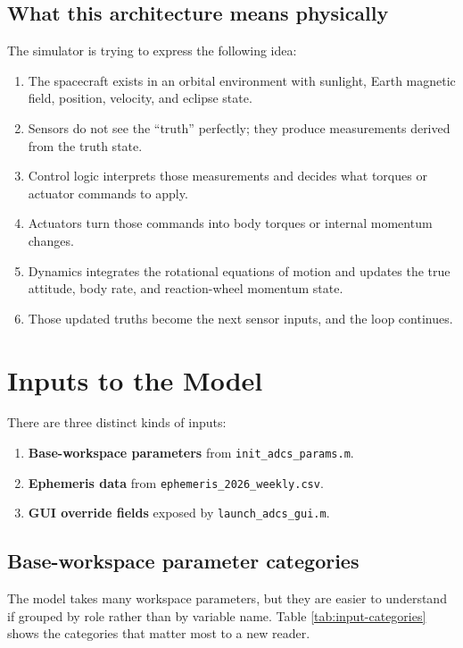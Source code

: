 \documentclass[11pt]{article}
\begin{document}
\subsection{What this architecture means physically}

The simulator is trying to express the following idea:

\begin{enumerate}
\item The spacecraft exists in an orbital environment with sunlight, Earth magnetic field, position, velocity, and eclipse state.
\item Sensors do not see the ``truth'' perfectly; they produce measurements derived from the truth state.
\item Control logic interprets those measurements and decides what torques or actuator commands to apply.
\item Actuators turn those commands into body torques or internal momentum changes.
\item Dynamics integrates the rotational equations of motion and updates the true attitude, body rate, and reaction-wheel momentum state.
\item Those updated truths become the next sensor inputs, and the loop continues.
\end{enumerate}

\section{Inputs to the Model}

There are three distinct kinds of inputs:

\begin{enumerate}
\item \textbf{Base-workspace parameters} from \texttt{init\_adcs\_params.m}.
\item \textbf{Ephemeris data} from \texttt{ephemeris\_2026\_weekly.csv}.
\item \textbf{GUI override fields} exposed by \texttt{launch\_adcs\_gui.m}.
\end{enumerate}

\subsection{Base-workspace parameter categories}

The model takes many workspace parameters, but they are easier to understand if grouped by role rather than by variable name. Table \ref{tab:input-categories} shows the categories that matter most to a new reader.
\end{document}
